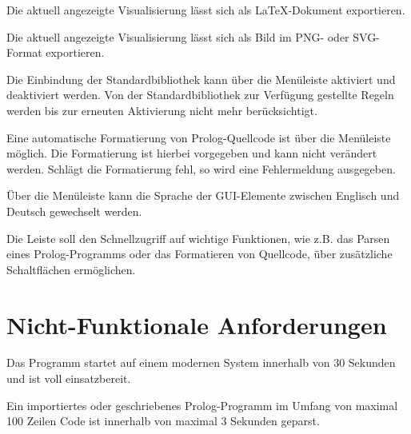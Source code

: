 \documentclass[parskip=full,11pt,twoside]{scrartcl}
\begin{document}
Die aktuell angezeigte Visualisierung lässt sich als LaTeX-Dokument exportieren.


Die aktuell angezeigte Visualisierung lässt sich als Bild im PNG- oder SVG-Format exportieren.


Die Einbindung der Standardbibliothek kann über die Menüleiste aktiviert und deaktiviert werden. Von der Standardbibliothek zur Verfügung gestellte Regeln werden bis zur erneuten Aktivierung nicht mehr berücksichtigt.


Eine automatische Formatierung von Prolog-Quellcode ist über die Menüleiste möglich. Die Formatierung ist hierbei vorgegeben und kann nicht verändert werden. Schlägt die Formatierung fehl, so wird eine Fehlermeldung ausgegeben.


Über die Menüleiste kann die Sprache der GUI-Elemente zwischen Englisch und Deutsch gewechselt werden.


Die Leiste soll den Schnellzugriff auf wichtige Funktionen, wie z.B. das Parsen eines Prolog-Programms oder das Formatieren von Quellcode, über zusätzliche Schaltflächen ermöglichen.

\section{Nicht-Funktionale Anforderungen}


Das Programm startet auf einem modernen System innerhalb von 30 Sekunden und ist voll einsatzbereit.


Ein importiertes oder geschriebenes Prolog-Programm im Umfang von maximal 100 Zeilen Code ist innerhalb von maximal 3 Sekunden geparst.
\end{document}
